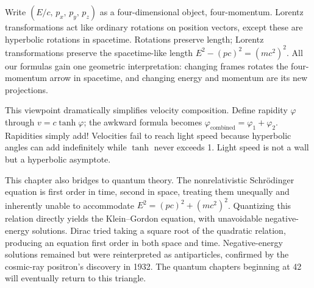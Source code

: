 \begin{challenge}
Write \((E/c,\,p_x,\,p_y,\,p_z)\) as a four-dimensional object, four-momentum. Lorentz transformations act like ordinary rotations on position vectors, except these are hyperbolic rotations in spacetime. Rotations preserve length; Lorentz transformations preserve the spacetime-like length \(E^{2}-(pc)^{2}=(mc^{2})^{2}\). All our formulas gain one geometric interpretation: changing frames rotates the four-momentum arrow in spacetime, and changing energy and momentum are its new projections.

This viewpoint dramatically simplifies velocity composition. Define rapidity \(\varphi\) through \(v=c\tanh\varphi\); the awkward formula becomes \(\varphi_{\text{combined}}=\varphi_1+\varphi_2\). Rapidities simply add! Velocities fail to reach light speed because hyperbolic angles can add indefinitely while \(\tanh\) never exceeds 1. Light speed is not a wall but a hyperbolic asymptote.

This chapter also bridges to quantum theory. The nonrelativistic Schrödinger equation is first order in time, second in space, treating them unequally and inherently unable to accommodate \(E^{2}=(pc)^{2}+(mc^{2})^{2}\). Quantizing this relation directly yields the Klein--Gordon equation, with unavoidable negative-energy solutions. Dirac tried taking a square root of the quadratic relation, producing an equation first order in both space and time. Negative-energy solutions remained but were reinterpreted as antiparticles, confirmed by the cosmic-ray positron's discovery in 1932. The quantum chapters beginning at 42 will eventually return to this triangle.
\end{challenge}


